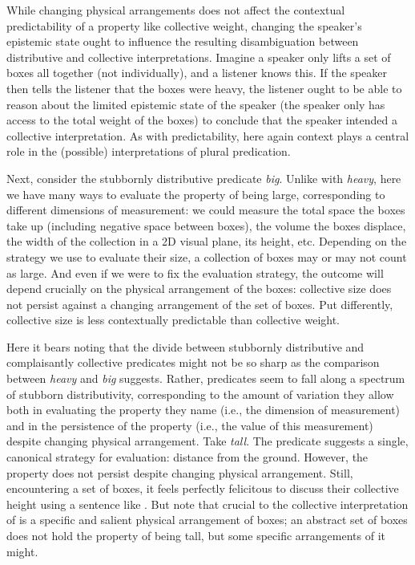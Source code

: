 \documentclass[linguex]{sp}
\begin{document}
While changing physical arrangements does not affect the contextual predictability of a property like collective weight, changing the speaker's epistemic state ought to influence the resulting disambiguation between distributive and collective interpretations. Imagine a speaker only lifts a set of boxes all together (not individually), and a listener knows this. If the speaker then tells the listener that the boxes were heavy, the listener ought to be able to reason about the limited epistemic state of the speaker (the speaker only has access to the total weight of the boxes) to conclude that the speaker intended a collective interpretation. As with predictability, here again context plays a central role in the (possible) interpretations of plural predication.

Next, consider the stubbornly distributive predicate \emph{big}. Unlike with \emph{heavy}, here we have many ways to evaluate the property of being large, corresponding to different dimensions of measurement: we could measure the total space the boxes take up (including negative space between boxes), the volume the boxes displace, the width of the collection in a 2D visual plane, its height, etc. Depending on the strategy we use to evaluate their size, a collection of boxes may or may not count as large. And even if we were to fix the evaluation strategy, the outcome will depend crucially on the physical arrangement of the boxes: collective size does not persist against a changing arrangement of the set of boxes. Put differently, collective size is less contextually predictable than collective weight.

Here it bears noting that the divide between stubbornly distributive and complaisantly collective predicates might not be so sharp as the comparison between \emph{heavy} and \emph{big} suggests. Rather, predicates seem to fall along a spectrum of stubborn distributivity, corresponding to the amount of variation they allow both in evaluating the property they name (i.e., the dimension of measurement) and in the persistence of the property (i.e., the value of this measurement) despite changing physical arrangement. Take \emph{tall}. The predicate suggests a single, canonical strategy for evaluation: distance from the ground. However, the property does not persist despite changing physical arrangement. Still, encountering a set of boxes, it feels perfectly felicitous to discuss their collective height using a sentence like \Next. But note that crucial to the collective interpretation of \Next is a specific  and salient physical arrangement of boxes; an abstract set of boxes does not hold the property of being tall, but some specific arrangements of it might.
\end{document}
